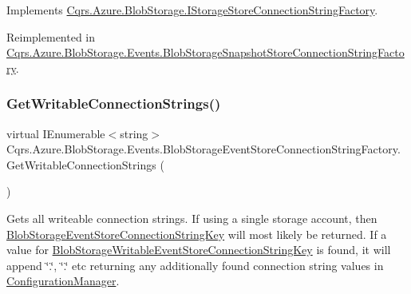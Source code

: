 Implements \hyperlink{interfaceCqrs_1_1Azure_1_1BlobStorage_1_1IStorageStoreConnectionStringFactory_a0ed836289e048767f753630bbcc98d5d_a0ed836289e048767f753630bbcc98d5d}{Cqrs.\+Azure.\+Blob\+Storage.\+I\+Storage\+Store\+Connection\+String\+Factory}.



Reimplemented in \hyperlink{classCqrs_1_1Azure_1_1BlobStorage_1_1Events_1_1BlobStorageSnapshotStoreConnectionStringFactory_ab226acce237117b81f7ea577b2190697_ab226acce237117b81f7ea577b2190697}{Cqrs.\+Azure.\+Blob\+Storage.\+Events.\+Blob\+Storage\+Snapshot\+Store\+Connection\+String\+Factory}.

\mbox{\label{classCqrs_1_1Azure_1_1BlobStorage_1_1Events_1_1BlobStorageEventStoreConnectionStringFactory_a002b45d6a893b1b3024b0e7c97f1c9ac_a002b45d6a893b1b3024b0e7c97f1c9ac}} 
\subsubsection{\texorpdfstring{Get\+Writable\+Connection\+Strings()}{GetWritableConnectionStrings()}}
{\footnotesize\ttfamily virtual I\+Enumerable$<$string$>$ Cqrs.\+Azure.\+Blob\+Storage.\+Events.\+Blob\+Storage\+Event\+Store\+Connection\+String\+Factory.\+Get\+Writable\+Connection\+Strings (\begin{DoxyParamCaption}{ }\end{DoxyParamCaption})\hspace{0.3cm}{\ttfamily [virtual]}}



Gets all writeable connection strings. If using a single storage account, then \hyperlink{classCqrs_1_1Azure_1_1BlobStorage_1_1Events_1_1BlobStorageEventStoreConnectionStringFactory_a36edb24cf0ef60114fc344b5d0bb619d_a36edb24cf0ef60114fc344b5d0bb619d}{Blob\+Storage\+Event\+Store\+Connection\+String\+Key} will most likely be returned. If a value for \hyperlink{classCqrs_1_1Azure_1_1BlobStorage_1_1Events_1_1BlobStorageEventStoreConnectionStringFactory_a3bf39254f211e4fbcbd9bc108c8d9fbc_a3bf39254f211e4fbcbd9bc108c8d9fbc}{Blob\+Storage\+Writable\+Event\+Store\+Connection\+String\+Key} is found, it will append \char`\"{}.\char`\"{}, \char`\"{}.\char`\"{} etc returning any additionally found connection string values in \hyperlink{namespaceCqrs_1_1Azure_1_1ConfigurationManager}{Configuration\+Manager}. 



